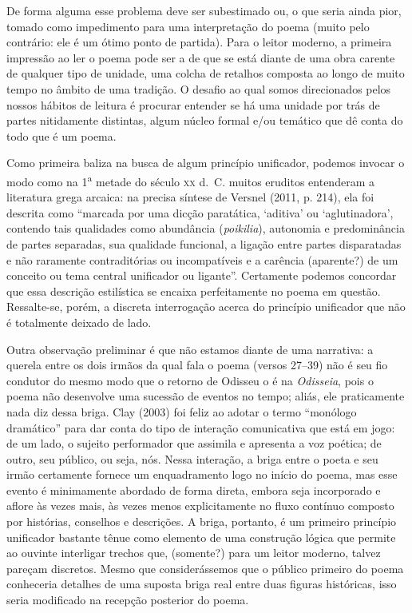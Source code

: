 De forma alguma esse problema deve ser subestimado ou, o que seria ainda
pior, tomado como impedimento para uma interpretação do poema (muito
pelo contrário: ele é um ótimo ponto de partida). Para o leitor moderno, 
a primeira impressão ao ler o poema pode ser a de que se está diante de 
uma obra carente de qualquer tipo de unidade, uma colcha de retalhos 
composta ao longo de muito tempo no âmbito de uma tradição. O desafio ao qual
somos direcionados pelos nossos hábitos de leitura é procurar entender
se há uma unidade por trás de partes nitidamente distintas, algum
núcleo formal e/ou temático que dê conta do todo que é um poema. 

Como primeira baliza na busca de algum princípio unificador, podemos
invocar o modo como na 1\textsuperscript{a} metade do século \textsc{xx} d.~C.
muitos eruditos entenderam a literatura grega arcaica: na precisa síntese de Versnel 
(2011, p. 214), ela foi descrita como “marcada por uma dicção paratática,
‘aditiva’ ou ‘aglutinadora’, contendo tais qualidades como abundância
(\textit{poikilia}), autonomia e predominância de partes separadas, sua
qualidade funcional, a ligação entre partes disparatadas e não
raramente contraditórias ou incompatíveis e a carência (aparente?) de
um conceito ou tema central unificador ou ligante”. Certamente podemos
concordar que essa descrição estilística se encaixa perfeitamente no
poema em questão. Ressalte-se, porém, a discreta interrogação acerca do
princípio unificador que não é totalmente deixado de lado.

Outra observação preliminar é que não estamos diante de uma narrativa: a
querela entre os dois irmãos da qual fala o poema (versos 27--39) não é
seu fio condutor do mesmo modo que o retorno de Odisseu o é na
\textit{Odisseia}, pois o poema não desenvolve uma sucessão de eventos
no tempo; aliás, ele praticamente nada diz dessa briga. Clay (2003) foi 
feliz ao adotar o termo “monólogo dramático” para dar conta do
tipo de interação comunicativa que está em jogo: de um lado, o sujeito
performador que assimila e apresenta a voz poética; de outro, seu
público, ou seja, nós. Nessa interação, a briga entre o poeta e seu
irmão certamente fornece um enquadramento logo no início do poema, mas
esse evento é minimamente abordado de forma direta, embora seja incorporado
e aflore às vezes mais, às vezes menos explicitamente no fluxo contínuo
composto por  histórias, conselhos e descrições. A briga, portanto, é
um primeiro princípio unificador bastante tênue como elemento de uma
construção lógica que permite ao ouvinte interligar trechos que,
(somente?) para um leitor moderno, talvez pareçam discretos. Mesmo que
considerássemos que o público primeiro do poema conheceria detalhes de
uma suposta briga real entre duas figuras históricas, isso
seria modificado na recepção posterior do poema.

